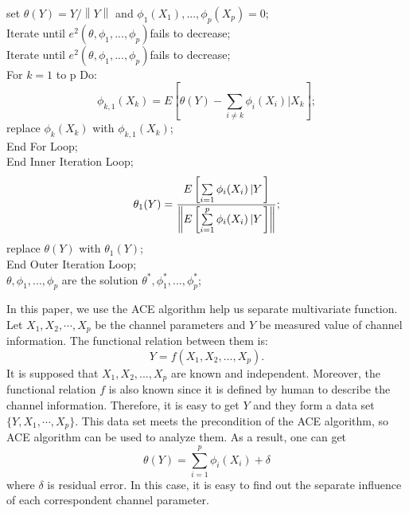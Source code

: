 \documentclass[conference]{IEEEtran}
\begin{document}
\begin{algorithm}[htb]
\caption{ACE Algorithm}
\label{alg:ACE}
\begin{algorithmic}[1]
\STATE set $\theta (Y) = Y/\left\| Y \right\|$ and ${\phi _1}({X_1}),...,{\phi _p}({X_p}) = 0$;\\
\STATE Iterate until $e^2(\theta,\phi_1,...,\phi_p)$fails to decrease;\\
\STATE Iterate until $e^2(\theta,\phi_1,...,\phi_p)$fails to decrease;\\
\STATE For $k=1$ to p Do:\\
\begin{equation*}
 {\phi _{k,1}}({X_k}) = E\left[ {\theta (Y) - \sum\limits_{i \ne k} {{\phi _i}\left( {{X_i}} \right)} \left| {{X_k}} \right.} \right];
\end{equation*}
replace $\phi_k(X_k)$ with $\phi_{k,1}(X_k)$;\\
End For Loop;\\
\STATE End Inner Iteration Loop;\\
\STATE \begin{equation*}
{\theta _1}(Y) = {{E\left[ {\sum\limits_{i = 1} {{\phi _i}({X_i})\left| Y \right.} } \right]} \over {\left\| {E\left[ {\sum\limits_{i = 1}^p {{\phi _i}({X_i})\left| Y \right.} } \right]} \right\|}};
\end{equation*}
replace $\theta(Y)$ with $\theta_1(Y)$;\\
\STATE End Outer Iteration Loop;\\
\STATE $\theta,\phi_1,...,\phi_p$ are the solution $\theta^*,\phi^*_1,...,\phi^*_p$;\\
\end{algorithmic}
\end{algorithm}

In this paper, we use the ACE algorithm help us separate multivariate function. Let $X_1,X_2,\cdots,X_p$ be the channel parameters and $Y$ be measured value of channel information. The functional relation between them is:
\begin{equation}\label{Eq ACE Alg4}
Y = f({X_1},{X_2},...,{X_p}).
\end{equation}
It is supposed that ${X_1},{X_2},...,{X_p}$ are known and independent. Moreover, the functional relation $f$ is also known since it is defined by human to describe the channel information. Therefore, it is easy to get $Y$ and they form a data set $\{Y,X_1,\cdots,X_p\}$. This data set meets the precondition of the ACE algorithm, so ACE algorithm can be used to analyze them. As a result, one can get
\begin{equation}\label{ACE_Def}
 \theta (Y) = \sum\limits_{i = 1}^p {{\phi _i}(X_i)}  + \delta
\end{equation}
where $\delta$ is residual error. In this case, it is easy to find out the separate influence of each correspondent channel parameter.
\end{document}
